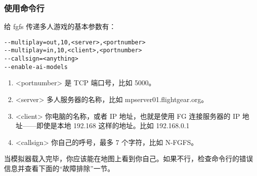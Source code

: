 \ifchinese
\subsubsection{使用命令行}

给 fgfs 传递多人游戏的基本参数有：
\fi
\iffalse
\IfLanguageName{english}{
\subsubsection{Using the Command Line}

The basic arguments to pass to fgfs for multiplayer are these:
}{}
\fi
{}

\begin{verbatim}
--multiplay=out,10,<server>,<portnumber>
--multiplay=in,10,<client>,<portnumber>
--callsign=<anything>
--enable-ai-models
\end{verbatim}

\ifchinese
\begin{enumerate}
\item <portnumber> 是 TCP 端口号，比如 5000。
\item <server> 多人服务器的名称，比如 mpserver01.flightgear.org。
\item <client> 你电脑的名称，或者 IP 地址，也就是使用 FG 连接服务器的 IP 地址——即使是本地 192.168 这样的地址。比如 192.168.0.1
\item <callsign> 你自己的呼号，最多 7 个字符，比如 N-FGFS。
\end{enumerate}

当模拟器载入完毕，你应该能在地图上看到你自己。如果不行，检查命令行的错误信息并查看下面的“故障排除”一节。
\fi
\iffalse
\IfLanguageName{english}{
Where
\begin{enumerate}
\item <portnumber> is the TCP port number of the server e.g. 5000.
\item <server> is the name of the multiplayer server e.g. mpserver01.flightgear.org.
\item <client> is the name of your computer, or the IP address ip address of the network interface being
used by FG to connect to the server - even if that's a local 192.168 type address. e.g. 192.168.0.1
\item <callsign> is the call sign to identify yourself, up to 7 characters, e.g. N-FGFS.
\end{enumerate}

Once the simulator has loaded, you should see yourself displayed on the map. If you don't, check the
console for error messages and see the Troubleshooting section below.
}{}
\fi

